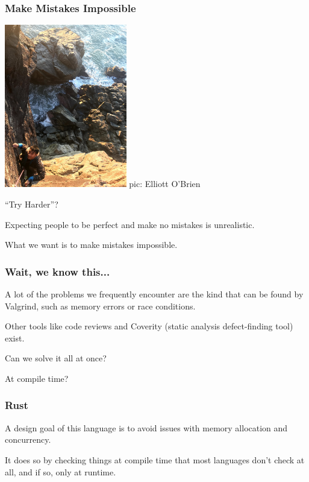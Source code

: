 \begin{frame}
\frametitle{Make Mistakes Impossible}

\begin{center}
	\includegraphics[width=0.4\textwidth]{images/plam-trying-harder.jpg}
        {\scriptsize pic: Elliott O'Brien}
\end{center}
``Try Harder''?

 Expecting people to be perfect and make no mistakes is unrealistic.
 
  What we want is to make mistakes impossible.


\end{frame}


\begin{frame}
\frametitle{Wait, we know this...}

A lot of the problems we frequently encounter are the kind that can be found by Valgrind, such as memory errors or race conditions.

Other tools like code reviews and Coverity (static analysis defect-finding tool) exist.

Can we solve it all at once?

At compile time?

\end{frame}



\begin{frame}
\frametitle{Rust}

A design goal of this language is to avoid issues with memory allocation and concurrency. 


It does so by checking things at compile time that most languages don't check at all, and if so, only at runtime.

\end{frame}



